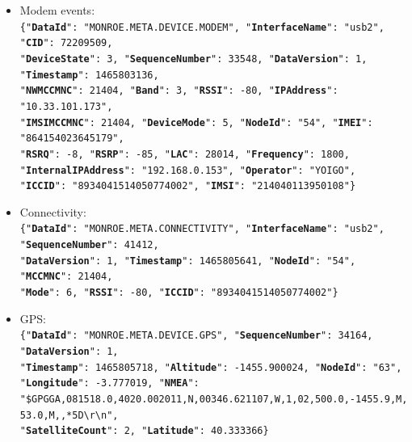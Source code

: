 \documentclass[a4paper,10pt]{article}
\begin{document}
\begin{itemize}
	\item Modem events:\\
	\texttt{\footnotesize\{"\textbf{DataId}": "MONROE.META.DEVICE.MODEM", "\textbf{InterfaceName}": "usb2", "\textbf{CID}": 72209509,\\
		"\textbf{DeviceState}": 3, "\textbf{SequenceNumber}": 33548, "\textbf{DataVersion}": 1, "\textbf{Timestamp}": 1465803136, \\
		"\textbf{NWMCCMNC}": 21404, "\textbf{Band}": 3, "\textbf{RSSI}": -80, "\textbf{IPAddress}": "10.33.101.173", \\
		"\textbf{IMSIMCCMNC}": 21404, "\textbf{DeviceMode}": 5, "\textbf{NodeId}": "54", "\textbf{IMEI}": "864154023645179", \\
		"\textbf{RSRQ}": -8, "\textbf{RSRP}": -85, "\textbf{LAC}": 28014, "\textbf{Frequency}": 1800, \\
		"\textbf{InternalIPAddress}": "192.168.0.153", "\textbf{Operator}": "YOIGO", \\
		"\textbf{ICCID}": "8934041514050774002", "\textbf{IMSI}": "214040113950108"\}}
	
	\item Connectivity:\\
	\texttt{\footnotesize\{"\textbf{DataId}": "MONROE.META.CONNECTIVITY", "\textbf{InterfaceName}": "usb2", "\textbf{SequenceNumber}": 41412, \\
		"\textbf{DataVersion}": 1, "\textbf{Timestamp}": 1465805641, "\textbf{NodeId}": "54", "\textbf{MCCMNC}": 21404, \\
		"\textbf{Mode}": 6, "\textbf{RSSI}": -80, "\textbf{ICCID}": "8934041514050774002"\}}
	
	\item GPS:\\
	\texttt{\footnotesize\{"\textbf{DataId}": "MONROE.META.DEVICE.GPS", "\textbf{SequenceNumber}": 34164, "\textbf{DataVersion}": 1, \\
		"\textbf{Timestamp}": 1465805718, "\textbf{Altitude}": -1455.900024, "\textbf{NodeId}": "63", \\
		"\textbf{Longitude}": -3.777019, "\textbf{NMEA}":\\ "\$GPGGA,081518.0,4020.002011,N,00346.621107,W,1,02,500.0,-1455.9,M,53.0,M,,*5D\textbackslash{}r\textbackslash{}n",\\
		"\textbf{SatelliteCount}": 2, "\textbf{Latitude}": 40.333366\}}
	
\end{itemize}

\end{document}
